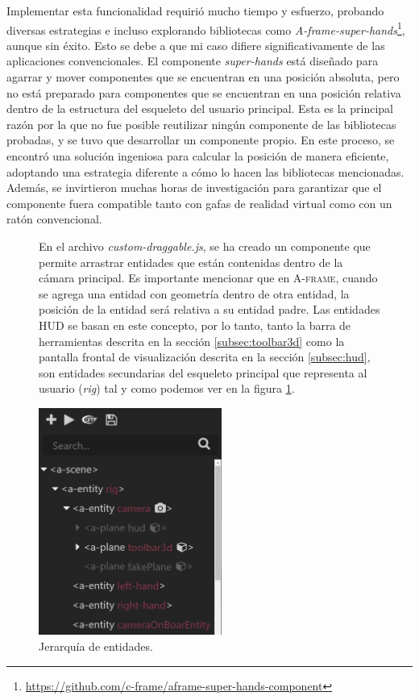 \documentclass[a4paper, 11pt]{book}
\begin{document}
Implementar esta funcionalidad requirió mucho tiempo y esfuerzo, probando diversas estrategias e incluso explorando bibliotecas como \emph{A-frame-super-hands}\footnote{\url{https://github.com/c-frame/aframe-super-hands-component}}, aunque sin éxito. Esto se debe a que mi caso difiere significativamente de las aplicaciones convencionales.
El componente \emph{super-hands} está diseñado para agarrar y mover componentes que se encuentran en una posición absoluta, pero no está preparado para componentes que se encuentran en una posición relativa dentro de la estructura del esqueleto del usuario principal. Esta es la principal razón por la que no fue posible reutilizar ningún componente de las bibliotecas probadas, y se tuvo que desarrollar un componente propio. En este proceso, se encontró una solución ingeniosa para calcular la posición de manera eficiente, adoptando una estrategia diferente a cómo lo hacen las bibliotecas mencionadas. 
Además, se invirtieron muchas horas de investigación para garantizar que el componente fuera compatible tanto con gafas de realidad virtual como con un ratón convencional.\\
\begin{figure}[H]
  \begin{minipage}[b]{0.58\linewidth}
    En el archivo \emph{custom-draggable.js}, se ha creado un componente que permite arrastrar entidades que están contenidas dentro de la cámara principal. Es importante mencionar que en \textsc{A-frame}, cuando se agrega una entidad con geometría dentro de otra entidad, la posición de la entidad será relativa a su entidad padre. Las entidades \textsc{\gls{HUD}} se basan en este concepto, por lo tanto, tanto la barra de herramientas descrita en la sección \ref{subsec:toolbar3d} como la pantalla frontal de visualización descrita en la sección \ref{subsec:hud}, son entidades secundarias del esqueleto principal que representa al usuario (\emph{rig}) tal y como podemos ver en la figura \ref{fig:jerarquiaEntidadesRig}.
  \end{minipage}%
  \hfill
  \begin{minipage}[b]{0.4\linewidth}
    \centering
    \includegraphics[width=6cm, keepaspectratio]{img/jerarquiaRig.jpg}
    \caption{Jerarquía de entidades.}
    \label{fig:jerarquiaEntidadesRig}    
  \end{minipage}
\end{figure}
\end{document}
